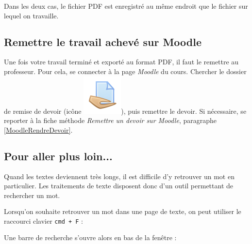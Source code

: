 Dans les deux cas, le fichier PDF est enregistré au même endroit que le fichier sur lequel on travaille.










\subsection{Remettre le travail achevé sur Moodle}

Une fois votre travail terminé et exporté au format PDF, il faut le remettre au professeur. Pour cela, se connecter à la page \emph{Moodle} du cours. Chercher le dossier de remise de devoir (icône \includegraphics[width=.04\textwidth]{./images/methode/MoodleDevoirIcone1}), puis remettre le devoir. Si nécessaire, se reporter à la fiche méthode \emph{Remettre un devoir sur Moodle}, paragraphe \vref{MoodleRendreDevoir}.  





\subsection{Pour aller plus loin...}  

Quand les textes deviennent très longs, il est difficile d'y retrouver un mot en particulier. Les traitements de texte disposent donc d'un outil permettant de rechercher un mot. 

Lorsqu'on souhaite retrouver un mot dans une page de texte, on peut utiliser le raccourci clavier \texttt{cmd + F} :   


Une barre de recherche s'ouvre alors en bas de la fenêtre :

